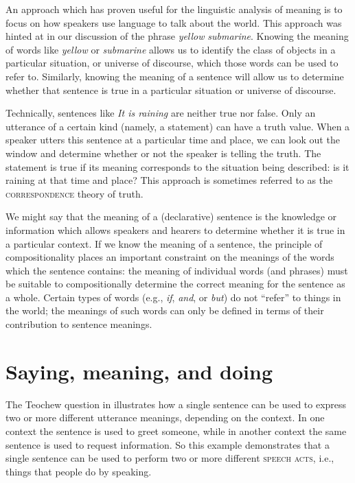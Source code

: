 An approach which has proven useful for the linguistic analysis of meaning is to focus on how speakers use language to talk about the world. This approach was hinted at in our discussion of the phrase \textit{yellow} \textit{submarine}. Knowing the meaning of words like \textit{yellow} or \textit{submarine} allows us to identify the class of objects in a particular situation, or universe of discourse, which those words can be used to refer to. Similarly, knowing the meaning of a sentence will allow us to determine whether that sentence is true in a particular situation or universe of discourse.



Technically, sentences like \textit{It is raining} are neither true nor false. Only an utterance of a certain kind (namely, a statement) can have a truth value. When a speaker utters this sentence at a particular time and place, we can look out the window and determine whether or not the speaker is telling the truth. The statement is true if its meaning corresponds to the situation being described: is it raining at that time and place? This approach is sometimes referred to as the \textsc{correspondence} theory of truth.



We might say that the meaning of a (declarative) sentence is the knowledge or information which allows speakers and hearers to determine whether it is true in a particular context. If we know the meaning of a sentence, the principle of compositionality places an important constraint on the meanings of the words which the sentence contains: the meaning of individual words (and phrases) must be suitable to compositionally determine the correct meaning for the sentence as a whole. Certain types of words (e.g., \textit{if}, \textit{and}, or \textit{but}) do not “refer” to things in the world; the meanings of such words can only be defined in terms of their contribution to sentence meanings.


\section{Saying, meaning, and doing}\label{sec:1.5}

The Teochew question in  illustrates how a single sentence can be used to express two or more different utterance meanings, depending on the context. In one context the sentence is used to greet someone, while in another context the same sentence is used to request information. So this example demonstrates that a single sentence can be used to perform two or more different \textsc{speech acts}, i.e., things that people do by speaking.



